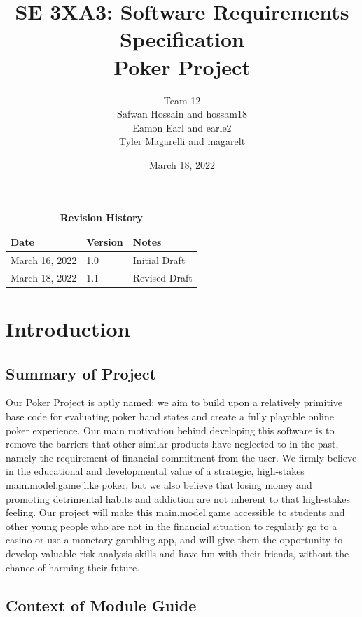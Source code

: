 \documentclass[12pt, titlepage]{article}
\title{SE 3XA3: Software Requirements Specification\\Poker Project}
\author{Team 12
        \\ Safwan Hossain and hossam18
        \\ Eamon Earl and earle2
        \\ Tyler Magarelli and magarelt
}
\date{March 18, 2022}
\begin{document}
\maketitle

\tableofcontents
\listoftables
\listoffigures

\begin{table}[bp]
\caption{\bf Revision History}
\begin{tabularx}{\textwidth}{p{3cm}p{2cm}X}
\toprule {\bf Date} & {\bf Version} & {\bf Notes}\\
\midrule
March 16, 2022 & 1.0 & Initial Draft\\
March 18, 2022 & 1.1 & Revised Draft\\
\bottomrule
\end{tabularx}
\end{table}

\newpage


\section{Introduction}

\subsection{Summary of Project}

Our Poker Project is aptly named; we aim to build upon a relatively primitive base code for evaluating poker hand states and create a fully playable online poker experience. Our main motivation behind developing this software is to remove the barriers that other similar products have neglected to in the past, namely the requirement of financial commitment from the user. We firmly believe in the educational and developmental value of a strategic, high-stakes main.model.game like poker, but we also believe that losing money and promoting detrimental habits and addiction are not inherent to that high-stakes feeling. Our project will make this main.model.game accessible to students and other young people who are not in the financial situation to regularly go to a casino or use a monetary gambling app, and will give them the opportunity to develop valuable risk analysis skills and have fun with their friends, without the chance of harming their future.

\subsection{Context of Module Guide}
\end{document}
